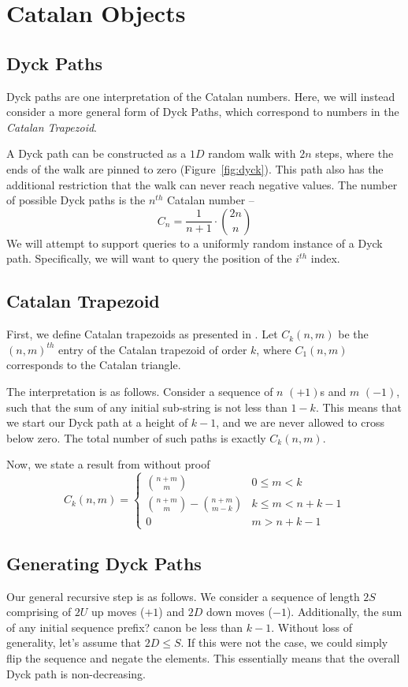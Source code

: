 \section{Catalan Objects}%
\label{sec:catalan_objects}


\subsection{Dyck Paths}
\label{sub:dyck_paths}


Dyck paths are one interpretation of the Catalan numbers.
Here, we will instead consider a more general form of Dyck Paths, which correspond to numbers in the \textit{Catalan Trapezoid}.

A Dyck path can be constructed as a $1D$ random walk with $2n$ steps,
where the ends of the walk are pinned to zero (Figure~\ref{fig:dyck}).
This path also has the additional restriction that the walk can never reach negative values.
The number of possible Dyck paths is the $n^{th}$ Catalan number --
$$C_n = \frac{1}{n+1}\cdot {2n\choose n}$$
We will attempt to support queries to a uniformly random instance of a Dyck path.
Specifically, we will want to query the position of the $i^{th}$ index.

\subsection{Catalan Trapezoid}
First, we define Catalan trapezoids as presented in \cite{trap}.
Let $C_k(n,m)$ be the $(n,m)^{th}$ entry of the Catalan trapezoid of order $k$, where $C_1(n,m)$ corresponds to the Catalan triangle.

The interpretation is as follows. Consider a sequence of $n$ $(+1)$s and $m$ $(-1)$,
such that the sum of any initial sub-string is not less than $1-k$.
This means that we start our Dyck path at a height of $k-1$, and we are never allowed to cross below zero.
The total number of such paths is exactly $C_k(n,m)$.

Now, we state a result from \cite{trap} without proof
$$
C_k(n,m)=
\begin{cases}
{n+m}\choose m &0\le m<k\\
{{n+m}\choose{m}} - {{n+m}\choose{m-k}} &k\le m<n+k-1\\
0 &m>n+k-1
\end{cases}
$$

\subsection{Generating Dyck Paths}
Our general recursive step is as follows.
We consider a sequence of length $2S$ comprising of $2U$ up moves ($+1$) and $2D$ down moves ($-1$).
Additionally, the sum of any initial sequence {\color{red} prefix?} canon be less than $k-1$.
Without loss of generality, let's assume that $2D\le S$. If this were not the case,
we could simply flip the sequence and negate the elements.
This essentially means that the overall Dyck path is non-decreasing.

